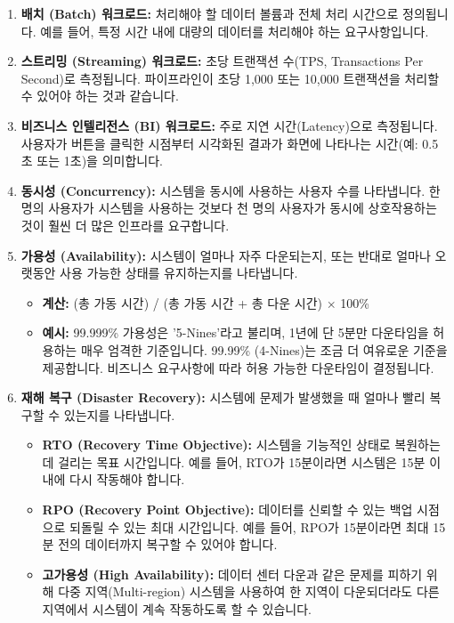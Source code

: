 \documentclass[11pt,a4paper]{article}
\begin{document}
\begin{enumerate}
    \item \textbf{배치 (Batch) 워크로드:}
    처리해야 할 데이터 볼륨과 전체 처리 시간으로 정의됩니다. 예를 들어, 특정 시간 내에 대량의 데이터를 처리해야 하는 요구사항입니다.

    \item \textbf{스트리밍 (Streaming) 워크로드:}
    초당 트랜잭션 수(TPS, Transactions Per Second)로 측정됩니다. 파이프라인이 초당 1,000 또는 10,000 트랜잭션을 처리할 수 있어야 하는 것과 같습니다.

    \item \textbf{비즈니스 인텔리전스 (BI) 워크로드:}
    주로 지연 시간(Latency)으로 측정됩니다. 사용자가 버튼을 클릭한 시점부터 시각화된 결과가 화면에 나타나는 시간(예: 0.5초 또는 1초)을 의미합니다.

    \item \textbf{동시성 (Concurrency):}
    시스템을 동시에 사용하는 사용자 수를 나타냅니다. 한 명의 사용자가 시스템을 사용하는 것보다 천 명의 사용자가 동시에 상호작용하는 것이 훨씬 더 많은 인프라를 요구합니다.

    \item \textbf{가용성 (Availability):}
    시스템이 얼마나 자주 다운되는지, 또는 반대로 얼마나 오랫동안 사용 가능한 상태를 유지하는지를 나타냅니다.
    \begin{itemize}
        \item \textbf{계산:} (총 가동 시간) / (총 가동 시간 + 총 다운 시간) $\times$ 100\%
        \item \textbf{예시:} 99.999\% 가용성은 '5-Nines'라고 불리며, 1년에 단 5분만 다운타임을 허용하는 매우 엄격한 기준입니다. 99.99\% (4-Nines)는 조금 더 여유로운 기준을 제공합니다. 비즈니스 요구사항에 따라 허용 가능한 다운타임이 결정됩니다.
    \end{itemize}

    \item \textbf{재해 복구 (Disaster Recovery):}
    시스템에 문제가 발생했을 때 얼마나 빨리 복구할 수 있는지를 나타냅니다.
    \begin{itemize}
        \item \textbf{RTO (Recovery Time Objective):} 시스템을 기능적인 상태로 복원하는 데 걸리는 목표 시간입니다. 예를 들어, RTO가 15분이라면 시스템은 15분 이내에 다시 작동해야 합니다.
        \item \textbf{RPO (Recovery Point Objective):} 데이터를 신뢰할 수 있는 백업 시점으로 되돌릴 수 있는 최대 시간입니다. 예를 들어, RPO가 15분이라면 최대 15분 전의 데이터까지 복구할 수 있어야 합니다.
        \item \textbf{고가용성 (High Availability):} 데이터 센터 다운과 같은 문제를 피하기 위해 다중 지역(Multi-region) 시스템을 사용하여 한 지역이 다운되더라도 다른 지역에서 시스템이 계속 작동하도록 할 수 있습니다.
    \end{itemize}
\end{enumerate}
\end{document}
